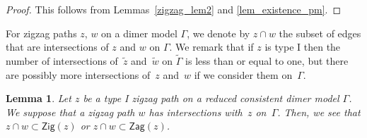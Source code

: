 \documentclass[11pt]{article}
\numberwithin{equation}{section}
\numberwithin{equation}{section}
\numberwithin{figure}{section}
\numberwithin{table}{section}
\newtheorem{Lemma}[Theorem]{Lemma}
\newcommand{\Zig}{\mathsf{Zig}}
\newcommand{\Zag}{\mathsf{Zag}}
\begin{document}
\begin{proof}
This follows from Lemmas~\ref{zigzag_lem2} and \ref{lem_existence_pm}.
\end{proof}

For zigzag paths $z$, $w$ on a dimer model $\Gamma$, we denote by $z\cap w$ the subset of edges that are intersections of $z$ and $w$ on $\Gamma$.
We remark that if $z$ is type I then the number of intersections of~$\widetilde{z}$ and~$\widetilde{w}$ on $\widetilde{\Gamma}$ is less than or equal to one, but there are possibly more intersections of~$z$ and~$w$ if we consider them on~$\Gamma$.

\begin{Lemma}\label{intersect_zigorzag}
Let $z$ be a type I zigzag path on a reduced consistent dimer model $\Gamma$.
We suppose that a zigzag path $w$ has intersections with~$z$ on~$\Gamma$.
Then, we see that $z\cap w\subset \Zig(z)$ or $z\cap w\subset \Zag(z)$.
\end{Lemma}
\end{document}
